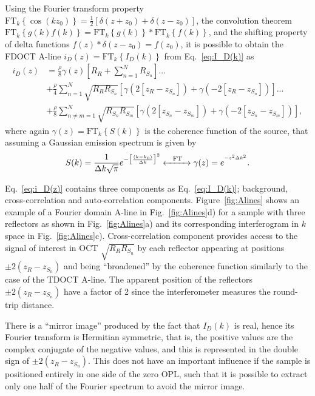 Using the Fourier transform property $\text{FT}_k\left\{\cos(kz_0)\right\} = \frac{1}{2}\left[\delta\left(z+z_0\right) + \delta\left(z-z_0\right)\right]$, the convolution theorem $\text{FT}_k\left\{g\left(k\right)f\left(k\right)\right\} = \text{FT}_k\left\{g\left(k\right)\right\} \ast \text{FT}_k\left\{f\left(k\right)\right\}$, and the shifting property of delta functions $f(z)*\delta\left(z-z_0\right) = f(z_0)$, it is possible to obtain the FDOCT A-line $i_D(z) = \text{FT}_k\left\{I_D(k)\right\}$ from Eq.~\ref{eq:I_D(k)} as
\begin{align}\label{eq:i_D(z)}
    i_D(z) &= \frac{\rho}{8}\gamma\left(z\right)\left[R_R + \sum_{n=1}^NR_{S_n}\right] ... \nonumber\\
    &+ \frac{\rho}{4}\sum_{n=1}^N \sqrt{R_RR_{S_n}} \left[\gamma\left(2\left[z_R-z_{S_n}\right]\right) + \gamma\left(-2\left[z_R-z_{S_n}\right]\right)\right]...\\
    &+ \frac{\rho}{8}\sum_{n\neq m=1}^N \sqrt{R_{S_n}R_{S_m}} \left[\gamma\left(2\left[z_{S_n}-z_{S_m}\right]\right) + \gamma\left(-2\left[z_{S_n}-z_{S_m}\right]\right)\right], \nonumber
\end{align}
where again $\gamma\left(z\right)=\text{FT}_k\left\{S(k)\right\}$ is the coherence function of the source, that assuming a Gaussian emission spectrum is given by
\begin{align} \label{eq:SGamma}
    S(k) =\frac{1}{\Delta k\sqrt{\pi}}e^{-\big[\frac{(k-k_0)}{\Delta k}\big]^2} \xleftrightarrow{\hspace{8 pt}\text{FT}\hspace{8 pt}} \gamma(z) = e^{^{-z^2\Delta k^2}}.
\end{align}

Eq.~\eqref{eq:i_D(z)} contains three components as Eq.~\eqref{eq:I_D(k)}; background, cross-correlation and auto-correlation components. Figure~\ref{fig:Alines} shows an example of a Fourier domain A-line in Fig.~\ref{fig:Alines}d) for a sample with three reflectors as shown in Fig.~\ref{fig:Alines}a) and its corresponding interferogram in $k$ space in Fig.~\ref{fig:Alines}c). Cross-correlation component provides access to the signal of interest in OCT $\sqrt{R_RR_{S_n}}$ by each reflector appearing at positions $\pm2(z_R-z_{S_n})$ and being ``broadened'' by the coherence function similarly to the case of the TDOCT A-line. The apparent position of the reflectors $\pm2(z_R-z_{S_n})$ have a factor of 2 since the interferometer measures the round-trip distance.

There is a ``mirror image'' produced by the fact that $I_D(k)$ is real, hence its Fourier transform is Hermitian symmetric, that is, the positive values are the complex conjugate of the negative values, and this is represented in the double sign of $\pm2(z_R-z_{S_n})$. This does not have an important influence if the sample is positioned entirely in one side of the zero OPL, such that it is possible to extract only one half of the Fourier spectrum to avoid the mirror image.

